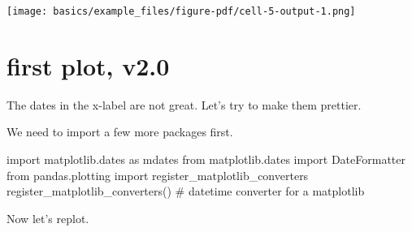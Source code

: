 \documentclass[
  letterpaper,
  DIV=11,
  numbers=noendperiod]{scrreprt}
\newenvironment{Shaded}{\begin{snugshade}}{\end{snugshade}}
\newcommand{\CommentTok}[1]{\textcolor[rgb]{0.37,0.37,0.37}{#1}}
\newcommand{\ImportTok}[1]{\textcolor[rgb]{0.00,0.46,0.62}{#1}}
\newcommand{\NormalTok}[1]{\textcolor[rgb]{0.00,0.23,0.31}{#1}}
\begin{document}
\texttt{[image: basics/example\_files/figure-pdf/cell-5-output-1.png]}

\section{first plot, v2.0}\label{first-plot-v2.0}

The dates in the x-label are not great. Let's try to make them prettier.

We need to import a few more packages first.

\begin{Shaded}
\begin{Highlighting}[]
\ImportTok{import}\NormalTok{ matplotlib.dates }\ImportTok{as}\NormalTok{ mdates}
\ImportTok{from}\NormalTok{ matplotlib.dates }\ImportTok{import}\NormalTok{ DateFormatter}
\ImportTok{from}\NormalTok{ pandas.plotting }\ImportTok{import}\NormalTok{ register\_matplotlib\_converters}
\NormalTok{register\_matplotlib\_converters()  }\CommentTok{\# datetime converter for a matplotlib}
\end{Highlighting}
\end{Shaded}

Now let's replot.
\end{document}
